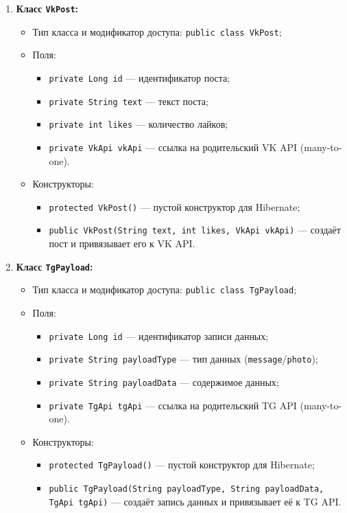 \documentclass[11pt,a4paper]{article}
\begin{document}
\begin{enumerate}
    \item \textbf{Класс \texttt{VkPost}:}
    \begin{itemize}
        \item Тип класса и модификатор доступа: \texttt{public class VkPost};
        \item Поля:
        \begin{itemize}
            \item \texttt{private Long id} --- идентификатор поста;
            \item \texttt{private String text} --- текст поста;
            \item \texttt{private int likes} --- количество лайков;
            \item \texttt{private VkApi vkApi} --- ссылка на родительский VK API (many-to-one).
        \end{itemize}
        \item Конструкторы:
        \begin{itemize}
            \item \texttt{protected VkPost()} --- пустой конструктор для Hibernate;
            \item \texttt{public VkPost(String text, int likes, VkApi vkApi)} --- создаёт пост и привязывает его к VK API.
        \end{itemize}
    \end{itemize}

    \item \textbf{Класс \texttt{TgPayload}:}
    \begin{itemize}
        \item Тип класса и модификатор доступа: \texttt{public class TgPayload};
        \item Поля:
        \begin{itemize}
            \item \texttt{private Long id} --- идентификатор записи данных;
            \item \texttt{private String payloadType} --- тип данных (\texttt{message}/\texttt{photo});
            \item \texttt{private String payloadData} --- содержимое данных;
            \item \texttt{private TgApi tgApi} --- ссылка на родительский TG API (many-to-one).
        \end{itemize}
        \item Конструкторы:
        \begin{itemize}
            \item \texttt{protected TgPayload()} --- пустой конструктор для Hibernate;
            \item \texttt{public TgPayload(String payloadType, String payloadData, TgApi tgApi)} --- создаёт запись данных и привязывает её к TG API.
        \end{itemize}
    \end{itemize}


\end{enumerate}
\end{document}
